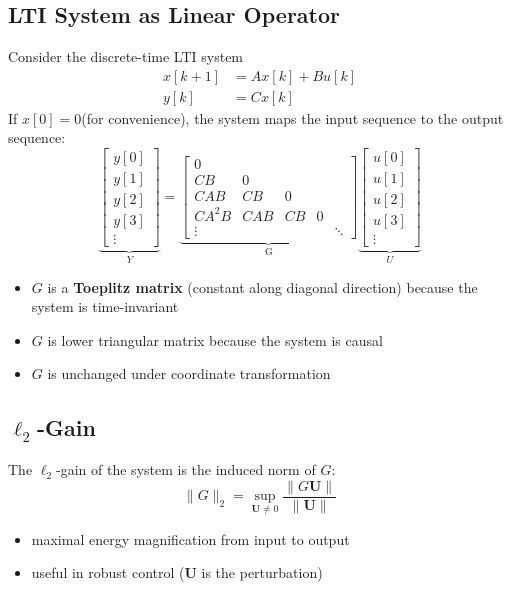 \documentclass[10pt,a4paper,oneside]{article}
\begin{document}
\subsection{LTI System as Linear Operator}
Consider the discrete-time LTI system
\[
\begin{aligned} x[k+1] &=A x[k]+B u[k] \\ y[k] &=C x[k] \end{aligned}
\]
If $x[0]=0$(for convenience), the system maps the input sequence to the output sequence:
\[
\underbrace{\left[\begin{array}{c}{y[0]} \\ {y[1]} \\ {y[2]} \\ {y[3]} \\ {\vdots}\end{array}\right]}_{Y}=\underbrace{\left[\begin{array}{ccccc}{0} & { } \\ {C B} & {0} \\ {C A B} & {C B} & {0}\\ {C A^{2} B} & {C A B} & {C B} & {0} \\ {\vdots} & {} & { } &{}& {\ddots}\end{array}\right]}_\text{G}\underbrace{\left[\begin{array}{c}{u[0]} \\ {u[1]} \\ {u[2]} \\ {u[3]} \\ {\vdots}\end{array}\right]}_\text{$U$}
\]
\begin{itemize}
\item $G$ is a \textbf{Toeplitz matrix} (constant along diagonal direction) because the system is time-invariant
\item $G$ is lower triangular matrix because the system is causal
\item $G$ is unchanged under coordinate transformation
\end{itemize}

\subsection{$\ell_2$-Gain}
The $\ell_{2}$-gain of the system is the induced norm of $G$:
\[
\|G\|_{2}=\sup _{\mathbf{U} \neq 0} \frac{\|G \mathbf{U}\|}{\|\mathbf{U}\|}
\]
\begin{itemize}
\item maximal energy magnification from input to output
\item useful in robust control ($\mathbf{U}$ is the perturbation)
\end{itemize}
\end{document}
